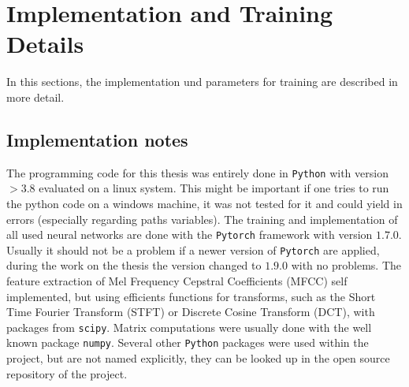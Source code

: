 
\section{Implementation and Training Details}\label{sec:exp_details}
\thesisStateNotReady
In this sections, the implementation und parameters for training are described in more detail.


\subsection{Implementation notes}\label{sec:exp_details_implementation}
The programming code for this thesis was entirely done in \texttt{Python} with version $>3.8$ evaluated on a linux system.
This might be important if one tries to run the python code on a windows machine, it was not tested for it and could yield in errors (especially regarding paths variables).
The training and implementation of all used neural networks are done with the \texttt{Pytorch} \cite{Pytorch} framework with version $1.7.0$. 
Usually it should not be a problem if a newer version of \texttt{Pytorch} are applied, during the work on the thesis the version changed to $1.9.0$ with no problems.
The feature extraction of Mel Frequency Cepstral Coefficients (MFCC) self implemented, but using efficients functions for transforms, such as the Short Time Fourier Transform (STFT) or Discrete Cosine Transform (DCT), with packages from \texttt{scipy}.
Matrix computations were usually done with the well known package \texttt{numpy}.
Several other \texttt{Python} packages were used within the project, but are not named explicitly, they can be looked up in the open source repository of the project.



